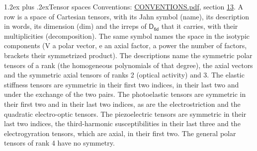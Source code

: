 \documentclass[10pt,a4paper]{article}
\makeatletter
\renewcommand\section{\@startsection{section}{1}{\z@}{-3ex plus -1ex minus -.2ex}%
  {1.2ex plus .2ex}{\normalfont\large\sffamily\bfseries\color{parttitle}}}
\numberwithin{equation}{section}
\newcommand{\grp}[1]{\mathsf{#1}}
\makeatother
\begin{document}
\section{Tensor spaces}\label{s:tensor_spaces}
Conventions: \href{../../CONVENTIONS.pdf}{CONVENTIONS.pdf}, section \href{../../CONVENTIONS.pdf\#conv.13}{13}.
\leavevmode\label{n:head.name}\label{n:head.description}\label{n:head.dim}\label{n:head.decomposition}A row is a space of Cartesian tensors, with its Jahn symbol (name), its description in words, its dimension (dim) and the irreps of $\grp{D_{6d}}$ that it carries, with their multiplicities (decomposition). \label{n:label.jahn}The same symbol names the space in the isotypic components (V a polar vector, e an axial factor, a power the number of factors, brackets their symmetrized product). The descriptions name the symmetric polar tensors of a rank (the homogeneous polynomials of that degree), the axial vectors and the symmetric axial tensors of ranks 2 (optical activity) and 3. The elastic stiffness tensors are symmetric in their first two indices, in their last two and under the exchange of the two pairs. The photoelastic tensors are symmetric in their first two and in their last two indices, as are the electrostriction and the quadratic electro-optic tensors. The piezoelectric tensors are symmetric in their last two indices, the third-harmonic susceptibilities in their last three and the electrogyration tensors, which are axial, in their first two. The general polar tensors of rank 4 have no symmetry.
\end{document}
